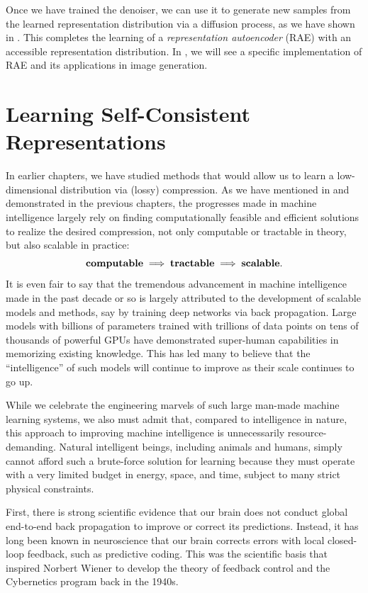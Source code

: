 \documentclass[../../book-main.tex]{subfiles}
\begin{document}
Once we have trained the denoiser, we can use it to generate new samples from
the learned representation distribution via a diffusion process, as we have
shown in . This completes the learning of
a \textit{representation autoencoder} (RAE) with an accessible representation distribution. 
In , we will see a specific implementation of RAE and its applications in image generation.



\section{Learning Self-Consistent Representations}
\label{sec:self-consistency}

In earlier chapters, we have studied methods that would allow us to learn a low-dimensional distribution via (lossy) compression. As we have mentioned in  and demonstrated in the previous chapters, the progresses made in machine intelligence largely rely on finding computationally feasible and efficient solutions to realize the desired compression, not only computable or tractable in theory, but also scalable in practice:
\begin{equation}
\mbox{\textbf{computable}} \;
   \Longrightarrow \; \mbox{\textbf{tractable}} \; \Longrightarrow \; 
   \mbox{\textbf{scalable}}.
\end{equation}
It is even fair to say that the tremendous advancement in machine intelligence made in the past decade or so is largely attributed to the development of scalable models and methods, say by training deep networks via back propagation. Large models with billions of parameters trained with trillions of data points on tens of thousands of powerful GPUs have demonstrated super-human capabilities in memorizing existing knowledge. This has led many to believe that the ``intelligence'' of such models will continue to improve as their scale continues to go up. 

While we celebrate the engineering marvels of such large man-made machine learning systems, we also must admit that, compared to intelligence in nature, this approach to improving machine intelligence is unnecessarily resource-demanding. Natural intelligent beings, including animals and humans, simply cannot afford such a brute-force solution for learning because they must operate with a very limited budget in energy, space, and time, subject to many strict physical constraints. 

First, there is strong scientific evidence that our brain does not conduct global end-to-end back propagation to improve or correct its predictions. Instead, it has long been known in neuroscience that our brain corrects errors with local closed-loop feedback, such as predictive coding. This was the scientific basis that inspired Norbert Wiener to develop the theory of feedback control and the Cybernetics program back in the 1940s. 
\end{document}
